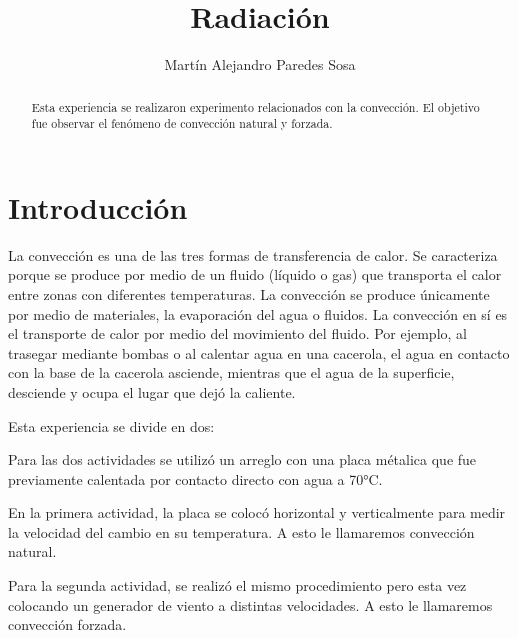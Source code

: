 \documentclass[12pt]{article}
\title{Radiación}
\author{Martín Alejandro Paredes Sosa}
\makeatletter
\let\thetitle\@title
\let\theauthor\@author
\makeatother
\begin{document}
\begin{center}
{ \large \bfseries \thetitle}
\end{center}
	\begin{minipage}{\textwidth}
		\begin{center} 
			\theauthor 
			\end{center}
	\end{minipage}
	\begin{abstract}
		Esta experiencia se realizaron experimento relacionados con la convección. El objetivo fue observar el fenómeno de convección natural y forzada.
	\end{abstract}

\section{Introducción}
\vspace{-0.5cm}
La convección es una de las tres formas de transferencia de calor. Se caracteriza porque se produce por medio de un fluido (líquido o gas) que transporta el calor entre zonas con diferentes temperaturas. La convección se produce únicamente por medio de materiales, la evaporación del agua o fluidos. La convección en sí es el transporte de calor por medio del movimiento del fluido. Por ejemplo, al trasegar mediante bombas o al calentar agua en una cacerola, el agua en contacto con la base de la cacerola asciende, mientras que el agua de la superficie, desciende y ocupa el lugar que dejó la caliente.

Esta experiencia se divide en dos:

Para las dos actividades se utilizó un arreglo con una placa métalica que fue previamente calentada por contacto directo con agua a 70°C. 

En la primera actividad, la placa se colocó horizontal y verticalmente para medir la velocidad del cambio en su temperatura. A esto le llamaremos convección natural.

Para la segunda actividad, se realizó el mismo procedimiento pero esta vez colocando un generador de viento a distintas velocidades. A esto le llamaremos convección forzada.

\end{document}
